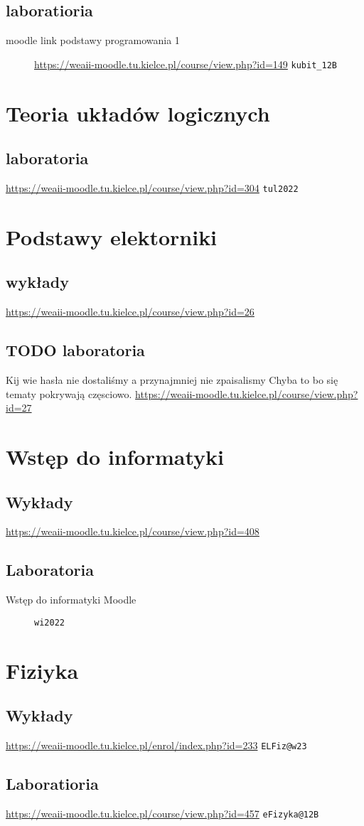 \documentclass[11pt]{article}
\begin{document}
\subsection{laboratioria}
\label{sec:orgc841e91}
\begin{description}
\item[{moodle link podstawy programowania 1}] \url{https://weaii-moodle.tu.kielce.pl/course/view.php?id=149} \texttt{kubit\_12B}
\end{description}
\section{Teoria układów logicznych}
\label{sec:orgf83e3e6}
\subsection{laboratoria}
\label{sec:org970ea8c}
\url{https://weaii-moodle.tu.kielce.pl/course/view.php?id=304} \texttt{tul2022}
\section{Podstawy elektorniki}
\label{sec:org59febcc}
\subsection{wykłady}
\label{sec:org0bdb3df}
\url{https://weaii-moodle.tu.kielce.pl/course/view.php?id=26}
\subsection{{\bfseries\sffamily TODO} laboratoria}
\label{sec:org6667e05}
Kij wie hasła nie dostaliśmy a przynajmniej nie zpaisalismy
Chyba to bo się tematy pokrywają częsciowo.
\url{https://weaii-moodle.tu.kielce.pl/course/view.php?id=27}
\section{Wstęp do informatyki}
\label{sec:orgb359e36}
\subsection{Wykłady}
\label{sec:org7d236a5}
\url{https://weaii-moodle.tu.kielce.pl/course/view.php?id=408}
\subsection{Laboratoria}
\label{sec:org4b7133c}
\begin{description}
\item[{Wstęp do informatyki Moodle}] \texttt{wi2022}
\end{description}
\section{Fiziyka}
\label{sec:org0453c4e}
\subsection{Wykłady}
\label{sec:org23130f8}
\url{https://weaii-moodle.tu.kielce.pl/enrol/index.php?id=233} \texttt{ELFiz@w23}
\subsection{Laboratioria}
\label{sec:org53ebf44}
\url{https://weaii-moodle.tu.kielce.pl/course/view.php?id=457} \texttt{eFizyka@12B}
\end{document}
